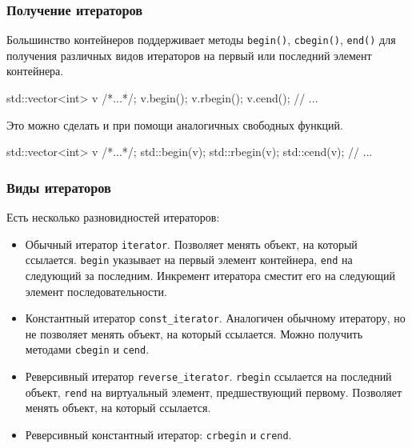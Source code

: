 \documentclass[compress, 8pt, aspectratio=169]{beamer}
\begin{document}
  \begin{frame}[fragile]

    \frametitle{Получение итераторов}

    Большинство контейнеров поддерживает методы
    \texttt{begin()}, \texttt{cbegin()}, \texttt{end()} для
    получения различных видов итераторов на первый или последний элемент
    контейнера.

    \begin{mycppinplacelisting}
std::vector<int> v {/*...*/};
v.begin();
v.rbegin();
v.cend();
// ...
    \end{mycppinplacelisting}

    Это можно сделать и при помощи аналогичных свободных функций.

    \begin{mycppinplacelisting}
std::vector<int> v {/*...*/};
std::begin(v);
std::rbegin(v);
std::cend(v);
// ...
    \end{mycppinplacelisting}

  \end{frame}

  \begin{frame}[fragile]

    \frametitle{Виды итераторов}

    Есть несколько разновидностей итераторов:

    \hfill \break
    \begin{itemize}

      \item Обычный итератор \texttt{iterator}.
        Позволяет менять объект, на который ссылается.
        \texttt{begin} указывает на первый элемент
        контейнера, \texttt{end} на следующий за последним.
        Инкремент итератора сместит его на следующий элемент
        последовательности.

      \item Константный итератор \texttt{const\_iterator}.
        Аналогичен обычному итератору, но не позволяет менять
        объект, на который ссылается.
        Можно получить методами \texttt{cbegin} и \texttt{cend}.

      \item Реверсивный итератор \texttt{reverse\_iterator}.
        \texttt{rbegin} ссылается на последний объект,
        \texttt{rend} \textemdash \space на виртуальный элемент, предшествующий
        первому.
        Позволяет менять объект, на который ссылается.

      \item Реверсивный константный итератор: \texttt{crbegin} и
        \texttt{crend}.
    \end{itemize}

  \end{frame}
\end{document}
